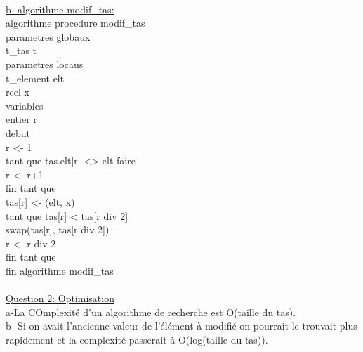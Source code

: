 \documentclass [11pt]{report}
\begin{document}
\vspace{5mm}\\
\indent \underline{ b- algorithme modif\_tas:}\\
\indent algorithme procedure modif\_tas\\
\indent \indent parametres globaux\\
\indent \indent \indent t\_tas t\\
\indent \indent parametres locaus\\
\indent \indent \indent t\_element elt\\
\indent \indent \indent reel x\\
\indent \indent variables\\
\indent \indent \indent entier r\\
\indent debut\\
\indent \indent r <- 1\\
\indent \indent tant que tas.elt[r] <> elt faire\\
\indent \indent \indent r <- r+1\\
\indent \indent fin tant que\\
\indent \indent tas[r] <- (elt, x)\\
\indent \indent tant que tas[r] < tas[r div 2]\\
\indent \indent \indent swap(tas[r], tas[r div 2])\\
\indent \indent \indent r <- r div 2\\
\indent \indent fin tant que\\
\indent fin algorithme modif\_tas\\
\vspace{5mm}\\
\underline{Question 2: Optimisation}\\
\indent a-La COmplexit\'e d'un algorithme de recherche est O(taille du tas).\\
\indent b- Si on avait l'ancienne valeur de l'\'el\'ement \`a modifi\'e on pourrait le trouvait plus rapidement et la complexit\'e passerait \`a O(log(taille du tas)).
\end{document}
